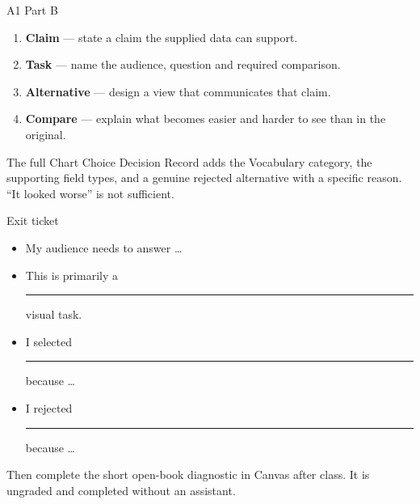 \documentclass[aspectratio=169,11pt]{beamer}
\begin{document}
\begin{frame}{A1 Part B}
  \begin{enumerate}
    \item \textbf{Claim} — state a claim the supplied data can support.
    \item \textbf{Task} — name the audience, question and required comparison.
    \item \textbf{Alternative} — design a view that communicates that claim.
    \item \textbf{Compare} — explain what becomes easier and harder to see than in the original.
  \end{enumerate}
  \vspace{0.6em}
  \small The full Chart Choice Decision Record adds the Vocabulary category,
  the supporting field types, and a \alert{genuine rejected alternative} with a
  specific reason. ``It looked worse'' is not sufficient.
\end{frame}

\begin{frame}{Exit ticket}
  \begin{itemize}
    \item My audience needs to answer \ldots
    \item This is primarily a \rule{4em}{0.4pt} visual task.
    \item I selected \rule{4em}{0.4pt} because \ldots
    \item I rejected \rule{4em}{0.4pt} because \ldots
  \end{itemize}
  \vspace{0.8em}
  \small Then complete the short open-book diagnostic in Canvas after class.
  It is ungraded and completed without an assistant.
\end{frame}
\end{document}
